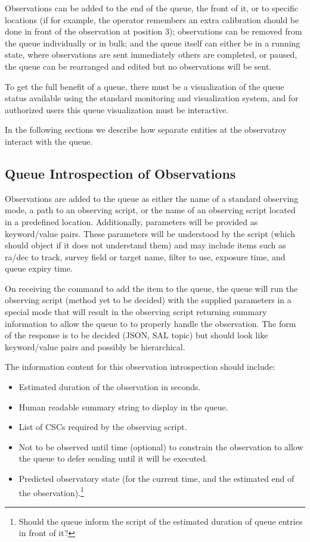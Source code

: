 \documentclass[TS,toc,lsstdraft]{lsstdoc}
\begin{document}
Observations can be added to the end of the queue, the front of it, or to specific locations (if for example, the operator remembers an extra calibration should be done in front of the observation at position 3); observations can be removed from the queue individually or in bulk; and the queue itself can either be in a running state, where observations are sent immediately others are completed, or paused, the queue can be rearranged and edited but no observations will be sent.

To get the full benefit of a queue, there must be a visualization of the queue status available using the standard monitoring and visualization system, and for authorized users this queue visualization must be interactive.

In the following sections we describe how separate entities at the observatroy interact with the queue.

\subsection{Queue Introspection of Observations}

Observations are added to the queue as either the name of a standard observing mode, a path to an observing script, or the name of an observing script located in a predefined location.
Additionally, parameters will be provided as keyword/value pairs.
These parameters will be understood by the script (which should object if it does not understand them) and may include items such as ra/dec to track, survey field or target name, filter to use, exposure time, and queue expiry time.

On receiving the command to add the item to the queue, the queue will run the observing script (method yet to be decided) with the supplied parameters in a special mode that will result in the observing script returning summary information to allow the queue to to properly handle the observation.
The form of the response is to be decided (JSON, SAL topic) but should look like keyword/value pairs and possibly be hierarchical.

The information content for this observation introspection should include:

\begin{itemize}
  \item Estimated duration of the observation in seconds.
  \item Human readable summary string to display in the queue.
  \item List of CSCs required by the observing script.
  \item Not to be observed until time (optional) to constrain the observation to allow the queue to defer sending until it will be executed.
  \item Predicted observatory state (for the current time, and the estimated end of the observation).\footnote{Should the queue inform the script of the estimated duration of queue entries in front of it?}
\end{itemize}
\end{document}
